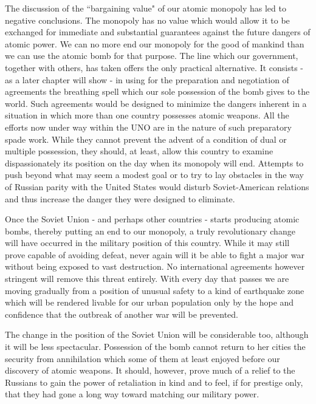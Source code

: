 The discussion of the ``bargaining value" of our atomic monopoly has led to negative conclusions. The monopoly has no value which would allow it to be exchanged for immediate and substantial guarantees against the future dangers of atomic power. We can no more end our monopoly for the good of mankind than we can use the atomic bomb for that purpose. The line which our government, together with others, has taken offers the only practical alternative. It consists - as a later chapter will show - in using for the preparation and negotiation of agreements the breathing spell which our sole possession of the bomb gives to the world. Such agreements would be designed to minimize the dangers inherent in a situation in which more than one country possesses atomic weapons. All the efforts now under way within the UNO are in the nature of such preparatory spade work. While they cannot prevent the advent of a condition of dual or multiple possession, they should, at least, allow this country to examine dispassionately its position on the day when its monopoly will end. Attempts to push beyond what may seem a modest goal or to try to lay obstacles in the way of Russian parity with the United States would disturb Soviet-American relations and thus increase the danger they were designed to eliminate.

Once the Soviet Union - and perhaps other countries - starts producing atomic bombs, thereby putting an end to our monopoly, a truly revolutionary change will have occurred in the military position of this country. While it may still prove capable of avoiding defeat, never again will it be able to fight a major war without being exposed to vast destruction. No international agreements however stringent will remove this threat entirely. With every day that passes we are moving gradually from a position of unusual safety to a kind of earthquake zone which will be rendered livable for our urban population only by the hope and confidence that the outbreak of another war will be prevented.

The change in the position of the Soviet Union will be considerable too, although it will be less spectacular. Possession of the bomb cannot return to her cities the security from annihilation which some of them at least enjoyed before our discovery of atomic weapons. It should, however, prove much of a relief to the Russians to gain the power of retaliation in kind and to feel, if for prestige only, that they had gone a long way toward matching our military power.

